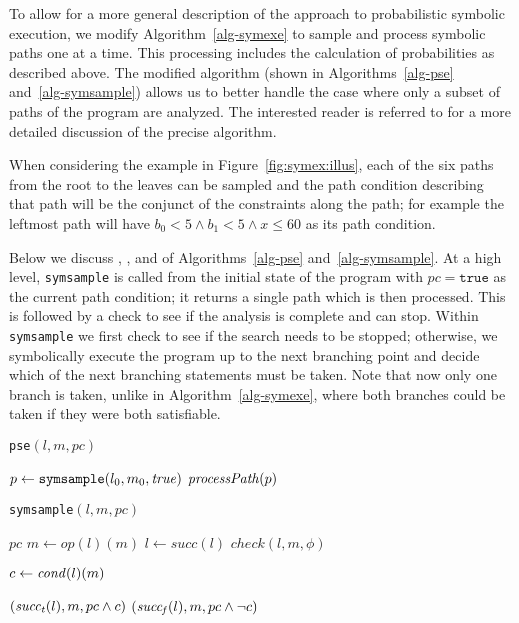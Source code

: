 To allow for a more general description of the approach to probabilistic symbolic execution, we modify Algorithm~\ref{alg-symexe} to sample and process symbolic paths one at a time. This processing includes the calculation of probabilities as described above.  The modified algorithm (shown in Algorithms~\ref{alg-pse} and~\ref{alg-symsample}) allows us to better handle the case where only a subset of paths of the program are analyzed. The interested reader is referred to \cite{filieri2014statistical} for a more detailed discussion of the precise algorithm.

When considering the example in Figure~\ref{fig:symex:illus}, each of the six paths from the root to the leaves can be sampled and the path condition describing that path will be the conjunct of the constraints along the path; for example the leftmost path will have $b_0 < 5 \wedge b_1 < 5 \wedge x \le 60$ as its path condition. 

Below we discuss , ,  and  of Algorithms~\ref{alg-pse} and~\ref{alg-symsample}. At a high level, {\tt symsample} is called from the initial state of the program with $pc=\mathtt{true}$ as the current path condition;  it returns a single path which is then processed.  This is followed by a check to see if the analysis is complete and can stop. Within {\tt symsample} we first check to see if the search needs to be stopped; otherwise, we symbolically execute the program up to the next branching point and decide which of the next branching statements must be taken. Note that now only one branch is taken, unlike in Algorithm~\ref{alg-symexe}, where both branches could be taken if they were both satisfiable. 

\begin{minipage}{0.4\textwidth}
\begin{algorithm}[H]
\caption{{\tt pse}$(l,m,pc)$}
\label{alg-pse}
\begin{algorithmic}
 \REPEAT
  \STATE $p \gets {\tt symsample}(l_0, m_0, \mathit{true})$
  \STATE $\mathit{processPath}(p)$
\end{algorithmic}
\end{algorithm}
\end{minipage}
\begin{minipage}{0.5\textwidth}
\begin{algorithm}[H]
\caption{{\tt symsample}$(l,m,pc)$}
\label{alg-symsample}
\begin{algorithmic}
 \RETURN $pc$
 \ENDIF
   \STATE $m \gets op(l)(m)$
   \STATE $l \gets succ(l)$
   \STATE $check(l,m,\phi)$
 \ENDWHILE
 
 
 \STATE $c \gets \mathit{cond}(l)(m)$
 
   $(\mathit{succ_t}(l), m, pc \wedge c)$
 \ELSE
   $(\mathit{succ_f}(l), m, pc \wedge \neg c)$
 \ENDIF
\end{algorithmic}
\end{algorithm}
\end{minipage}

